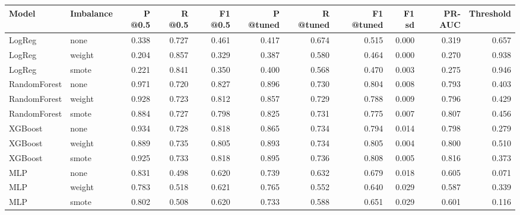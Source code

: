 \begin{tabular}{llrrrrrrrrr}
\toprule
Model & Imbalance & P @0.5 & R @0.5 & F1 @0.5 & P @tuned & R @tuned & F1 @tuned & F1 sd & PR-AUC & Threshold \\
\midrule
LogReg & none & 0.338 & 0.727 & 0.461 & 0.417 & 0.674 & 0.515 & 0.000 & 0.319 & 0.657 \\
LogReg & weight & 0.204 & 0.857 & 0.329 & 0.387 & 0.580 & 0.464 & 0.000 & 0.270 & 0.938 \\
LogReg & smote & 0.221 & 0.841 & 0.350 & 0.400 & 0.568 & 0.470 & 0.003 & 0.275 & 0.946 \\
RandomForest & none & 0.971 & 0.720 & 0.827 & 0.896 & 0.730 & 0.804 & 0.008 & 0.793 & 0.403 \\
RandomForest & weight & 0.928 & 0.723 & 0.812 & 0.857 & 0.729 & 0.788 & 0.009 & 0.796 & 0.429 \\
RandomForest & smote & 0.884 & 0.727 & 0.798 & 0.825 & 0.731 & 0.775 & 0.007 & 0.807 & 0.456 \\
XGBoost & none & 0.934 & 0.728 & 0.818 & 0.865 & 0.734 & 0.794 & 0.014 & 0.798 & 0.279 \\
XGBoost & weight & 0.889 & 0.735 & 0.805 & 0.893 & 0.734 & 0.805 & 0.004 & 0.800 & 0.510 \\
XGBoost & smote & 0.925 & 0.733 & 0.818 & 0.895 & 0.736 & 0.808 & 0.005 & 0.816 & 0.373 \\
MLP & none & 0.831 & 0.498 & 0.620 & 0.739 & 0.632 & 0.679 & 0.018 & 0.605 & 0.071 \\
MLP & weight & 0.783 & 0.518 & 0.621 & 0.765 & 0.552 & 0.640 & 0.029 & 0.587 & 0.339 \\
MLP & smote & 0.802 & 0.508 & 0.620 & 0.733 & 0.588 & 0.651 & 0.029 & 0.601 & 0.116 \\
\bottomrule
\end{tabular}
